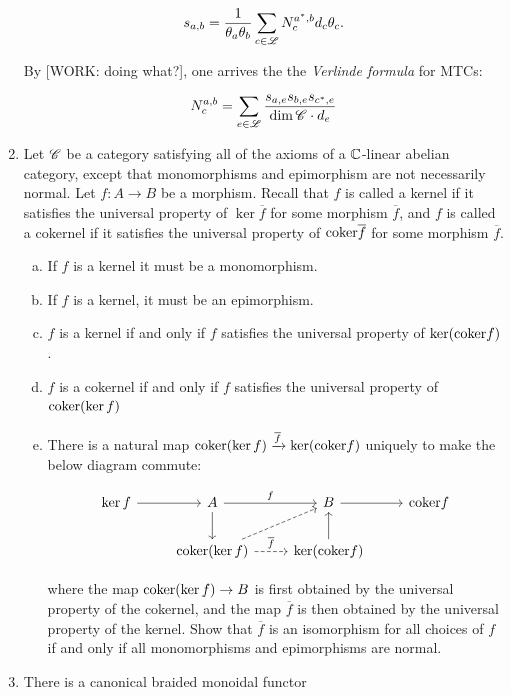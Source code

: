 \documentclass{article}
\theoremstyle{definition}
\numberwithin{figure}{section}
\begin{document}
\begin{enumerate}[\thesection .1.]
$$s_{a,b}=\frac{1}{\theta_a \theta_b}\sum_{c\in \mathscr{L}}N^{a^*,b}_{c}d_{c}\theta_{c}.$$

By [WORK: doing what?], one arrives the the \textit{Verlinde formula} for MTCs:

$$N^{a,b}_{c}=\sum_{e\in \mathscr{L}} \frac{s_{a,e} s_{b,e}s_{c^*,e}}{\dim{\mathscr{C}}\cdot d_e}$$

\item Let $\mathscr{C}$ be a category satisfying all of the axioms of a $\mathbb{C}$-linear abelian category, except that monomorphisms and epimorphism are not necessarily normal. Let $f:A\to B$ be a morphism. Recall that $f$ is called a kernel if it satisfies the universal property of $\ker \overline{f}$ for some morphism $\overline{f}$, and $f$ is called a cokernel if it satisfies the universal property of $\mathrm{coker} \overline{f}$ for some morphism $\overline{f}$.

\begin{enumerate}[(a)]
\item If $f$ is a kernel it must be a monomorphism.
\item If $f$ is a kernel, it must be an epimorphism.
\item $f$ is a kernel if and only if $f$ satisfies the universal property of $\ker(\mathrm{coker} f)$.
\item $f$ is a cokernel if and only if $f$ satisfies the universal property of $\mathrm{coker}(\ker f)$
\item There is a natural map $\mathrm{coker}(\ker f)\xrightarrow{\overline{f}} \ker(\mathrm{coker} f)$ uniquely to make the below diagram commute:

\[\begin{tikzcd}
	{\ker f} & A & B & {\coker f} \\
	& {\coker (\ker f)} & {\ker (\coker f)}
	\arrow[from=1-1, to=1-2]
	\arrow["f", from=1-2, to=1-3]
	\arrow[from=1-3, to=1-4]
	\arrow[from=1-2, to=2-2]
	\arrow[from=2-3, to=1-3]
	\arrow[dashed, from=2-2, to=1-3]
	\arrow["{\overline{f}}", dashed, from=2-2, to=2-3]
\end{tikzcd}\]

where the map $\mathrm{coker} (\ker f)\to B$ is first obtained by the universal property of the cokernel, and the map $\overline{f}$ is then obtained by the universal property of the kernel. Show that $\overline{f}$ is an isomorphism for all choices of $f$ if and only if all monomorphisms and epimorphisms are normal.
\end{enumerate}

\item There is a canonical braided monoidal functor


\end{enumerate}
\end{document}
